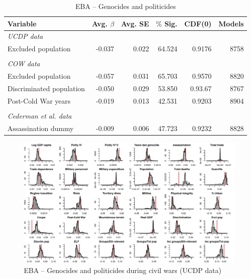 \begin{table}[H]
\centering
\begin{tabular}{lrrrrr}
\hline
\textbf{Variable} & \textbf{Avg. $\beta$} & \textbf{Avg. SE} & \textbf{$\%$ Sig.} & \textbf{CDF(0)} & \textbf{Models} \\ \hline
\textit{UCDP data} &  &  &  &  &  \\
Excluded population & -0.037 & 0.022 & 64.524 & 0.9176 & 8758 \\
 &  &  &  &  &  \\
\textit{COW data} &  &  &  &  &  \\
Excluded population & -0.057 & 0.031 & 65.703 & 0.9570 & 8820 \\
Discriminated population & -0.050 & 0.029 & 53.850 & 0.93.67 & 8767 \\
Post-Cold War years & -0.019 & 0.013 & 42.531 & 0.9203 & 8904 \\
 &  &  &  &  &  \\
\textit{Cederman et al. data} &  &  &  &  &  \\
Assassination dummy & -0.009 & 0.006 & 47.723 & 0.9232 & 8828 \\ \hline
\end{tabular}
\caption{EBA -- Genocides and politicides}
\label{tab:uamk1}
\end{table}

\newpage
\clearpage
\begin{figure}
    \centering
    \includegraphics[width=\textwidth]{images/uamk-ucdp.pdf}
    \caption{EBA -- Genocides and politicides during civil wars (UCDP data)}
    \label{fig:uamk-ucdp}
\end{figure}
\clearpage

